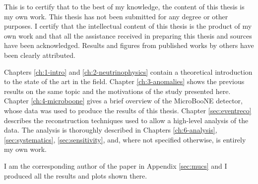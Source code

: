 This is to certify that to the best of my knowledge, the content of this thesis is my own work. This thesis has not been submitted for any degree or other purposes.
I certify that the intellectual content of this thesis is the product of my own work and that all the assistance received in preparing this thesis and sources have been acknowledged. Results and figures from published works by others have been clearly attributed.

Chapters \ref{ch:1-intro} and \ref{ch:2-neutrinophysics} contain a theoretical introduction to the state of the art in the field. Chapter \ref{ch:3-anomalies} shows the previous results on the same topic and the motivations of the study presented here. Chapter \ref{ch:4-microboone} gives a brief overview of the MicroBooNE detector, whose data was used to produce the results of this thesis. 
Chapter \ref{sec:eventreco} describes the reconstruction techniques used to allow a high-level analysis of the data. The analysis is thoroughly described in Chapters \ref{ch:6-analysis}, \ref{sec:systematics}, \ref{sec:sensitivity}, and, where not specified otherwise, is entirely my own work.

I am the corresponding author of the paper in Appendix \ref{sec:mucs} and I produced all the results and plots shown there.